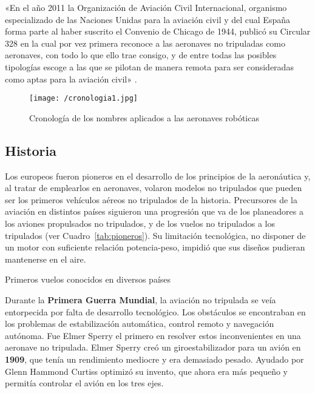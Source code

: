 «En el año 2011 la Organización de Aviación Civil Internacional, organismo especializado de las Naciones 
Unidas para la aviación civil y del cual España forma parte al haber suscrito el Convenio de Chicago de 1944, 
publicó su Circular 328 en la cual por vez primera reconoce a las aeronaves no tripuladas como aeronaves, 
con todo lo que ello trae consigo, y de entre todas las posibles tipologías escoge a las que se pilotan de manera 
remota para ser consideradas como aptas para la aviación civil» \cite{dron1}.

\begin{figure}[!h]
\begin{center}
\texttt{[image: /cronologia1.jpg]}
\caption[Caption]{Cronología de los nombres aplicados a las aeronaves robóticas\footnotemark}
\label{fig:cronologia}
\end{center}
\end{figure}


\subsection{Historia}

Los europeos fueron pioneros en el desarrollo de los principios de la aeronáutica y, al 
tratar de emplearlos en aeronaves, volaron modelos no tripulados que pueden ser los primeros vehículos 
aéreos no tripulados de la historia. Precursores de la aviación en distintos países siguieron una progresión que va de los
planeadores a los aviones propulsados no tripulados, y de los vuelos no tripulados a los
tripulados (ver Cuadro~\ref{tab:pioneros}). Su limitación tecnológica, no disponer de un motor con suficiente relación potencia-peso, 
impidió que sus diseños pudieran mantenerse en el aire.

\begin{table}[hp]
  \centering
  {\small
  
  }
  \caption[Primeros vuelos conocidos en diversos países]
  {Primeros vuelos conocidos en diversos países \cite{dron1}}
  \label{tab:pioneros}
\end{table}

Durante la \textbf{Primera Guerra Mundial}, la aviación no tripulada se veía entorpecida por falta de desarrollo tecnológico. 
Los obstáculos se encontraban en los problemas de estabilización automática, control remoto y navegación autónoma. Fue Elmer Sperry el primero en resolver estos inconvenientes en una aeronave no tripulada. Elmer Sperry creó un giroestabilizador para un avión en \textbf{1909}, que tenía un rendimiento mediocre y era demasiado pesado. Ayudado por Glenn Hammond Curtiss optimizó su invento, que ahora era 
más pequeño y permitía controlar el avión en los tres ejes.

